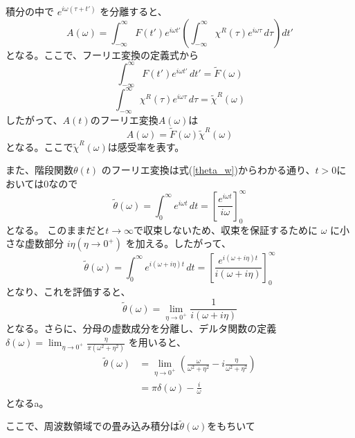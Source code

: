 \documentclass[11pt,a4j]{jreport}
\begin{document}
積分の中で $e^{i \omega (\tau + t')}$ を分離すると、
\begin{equation}
  A(\omega)= \int_{-\infty}^{\infty} F(t') e^{i \omega t'} \left( \int_{-\infty}^{\infty} \chi^R(\tau) e^{i \omega \tau} \, d\tau \right) dt'
\end{equation}
となる。ここで、フーリエ変換の定義式から
\begin{equation}
  \int_{-\infty}^{\infty} F(t') e^{i \omega t'} \, dt' = \tilde{F}(\omega)
\end{equation}
\begin{equation}
  \int_{-\infty}^{\infty} \chi^R(\tau) e^{i \omega \tau} \, d\tau = \tilde{\chi}^R(\omega)
\end{equation}
したがって、$A(t)$のフーリエ変換$A(\omega)$は
\begin{equation}
  A(\omega)= \tilde{F}(\omega) \tilde{\chi}^R(\omega)
\end{equation}
となる。ここで$\tilde{\chi}^R(\omega)$は感受率を表す。\par
また、階段関数$\theta(t)$ のフーリエ変換は式(\ref{theta_w})からわかる通り、$t>0$においては$0$なので
\begin{equation}
  \tilde{\theta}(\omega) = \int_{0}^{\infty} e^{i \omega t} \, dt = \left[ \frac{e^{i \omega t}}{i \omega} \right]_{0}^{\infty}
\end{equation}
となる。
このままだと$t \to \infty$で収束しないため、収束を保証するために $\omega$ に小さな虚数部分 $i \eta(\eta \to 0^+)$ を加える。したがって、
\begin{equation}
  \tilde{\theta}(\omega) = \int_{0}^{\infty} e^{i (\omega + i \eta) t} \, dt = \left[ \frac{e^{i (\omega + i \eta) t}}{i (\omega + i \eta)} \right]_{0}^{\infty}
\end{equation}
となり、これを評価すると、
\begin{equation}
  \tilde{\theta}(\omega) = \lim_{\eta \to 0^+} \frac{1}{i (\omega + i \eta)}
\end{equation}
となる。さらに、分母の虚数成分を分離し、デルタ関数の定義 $\delta(\omega) = \lim_{\eta \to 0^+} \frac{\eta}{\pi (\omega^2 + \eta^2)}$ を用いると、
\begin{align}
  \tilde{\theta}(\omega) &= \lim_{\eta \to 0^+} \left( \frac{\omega}{\omega^2 + \eta^2} - i \frac{\eta}{\omega^2 + \eta^2} \right)\\
  &= \pi \delta(\omega) - \frac{i}{\omega}
  \label{theta_omega1}
\end{align}
となるa。\par
ここで、周波数領域での畳み込み積分は$\tilde{\theta}(\omega)$をもちいて
\end{document}
